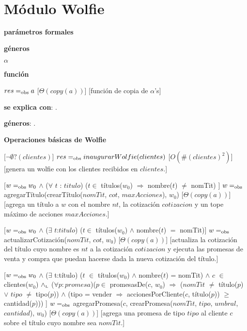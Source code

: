 \section{Módulo Wolfie}


\begin{Interfaz}
  
  \textbf{parámetros formales}\parindent\\
  \parbox{1.7cm}{\textbf{géneros}} $\alpha$\\
  \parbox[t]{1.7cm}{\textbf{función}}\parbox[t]{\textwidth-2\parindent-1.7cm}{%
    {$res =_{\mathrm{obs}} a$}
    [$\Theta(copy(a))$]
    [función de copia de $\alpha$'s]
  }

  \textbf{se explica con}: .

  \textbf{géneros}: .

  \textbf{Operaciones básicas de Wolfie}

  [$\neg \emptyset ?(clientes)$]
  {$res =_{\mathrm{obs}} inaugurarWolfie(clientes)$}%
  [$O(\#(clientes)^2)$]
  [genera un wolfie con los clientes recibidos en $clientes$.]

  [$w =_{\mathrm{obs}} w_0$ $\land$  ($\forall$ $t$ : $titulo$) ($t \in$ títulos($w_0$) $\Rightarrow$ nombre($t$) $\neq$ nomTit) ]
  {$w =_{\mathrm{obs}}$ agregarTítulo(crearTítulo($nomTit$, $cot$, $maxAcciones$), $w_0$)}
  [$\Theta(copy(a))$]
  [agrega un título a $w$ con el nombre $nt$, la cotización $cotizacion$ y un tope máximo de acciones $maxAcciones$.]
  
  [$w =_{\mathrm{obs}} w_0$ $\land$ ($\exists$ $t$:$titulo$) ($t \in$ títulos($w_0$) $\land$ nombre($t$) $=$ nomTit)]
  {$w =_{\mathrm{obs}}$ actualizarCotización($nomTit$, $cot$, $w_0$)}
  [$\Theta(copy(a))$]
  [actualiza la cotización del título cuyo nombre es $nt$ a la cotización $cotizacion$ y ejecuta las promesas de venta y compra que puedan hacerse dada la nueva cotización del título.]
  
  [$w =_{\mathrm{obs}} w_0$ $\land$ ($\exists$ t:título) ($t$ $\in$ títulos($w_0$)
  $\land$ nombre($t$) = nomTit) $\land$ $c$ $\in$ clientes($w_0$) $\land_{\mathrm{\scriptscriptstyle{L}}}$
  ($\forall p:promesa$)($p \in$ promesasDe($c$, $w_0$) $\Rightarrow$
  ($nomTit$ $\neq$ título($p$) $\lor$ $tipo$ $\neq$ tipo($p$)) $\land$ (tipo = vender $\Rightarrow$ accionesPorCliente($c$, título($p$)) $\geq$ cantidad($p$)))
  ]
  {$w =_{\mathrm{obs}}$ agregarPromesa($c$, crearPromesa($nomTit$, $tipo$, $umbral$, $cantidad$), $w_0$)}
  [$\Theta(copy(a))$]
  [agrega una promesa de tipo $tipo$ al cliente $c$ sobre el título cuyo nombre sea $nomTit$.]    
  

\end{Interfaz}

